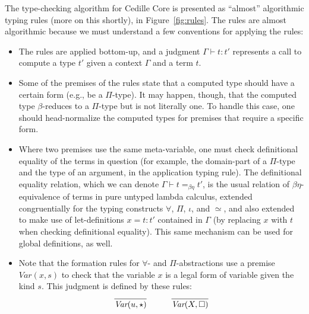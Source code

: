 \documentclass{article}
\begin{document}
The type-checking algorithm for Cedille Core is presented as ``almost'' algorithmic typing rules (more on this shortly),
in Figure~\ref{fig:rules}.  The rules are almost algorithmic because we must understand a few conventions for applying the rules:

\begin{itemize}
\item The rules are applied bottom-up, and a judgment $\Gamma\vdash t : t'$ represents a call to compute
  a type $t'$ given a context $\Gamma$ and a term $t$.
\item Some of the premises of the rules state that a computed type should have a certain form (e.g., be a $\Pi$-type).  It may happen, though, that the computed type $\beta$-reduces to a $\Pi$-type but is not literally one.  To handle this case, one should head-normalize the computed types for premises that require a specific form.
\item Where two premises use the same meta-variable, one must check definitional equality of the terms in question (for example, the domain-part of a $\Pi$-type and the type of an argument, in the application typing rule).
  The definitional equality relation, which we can denote $\Gamma \vdash t =_{\beta\eta} t'$,
  is the usual relation of $\beta\eta$-equivalence of
terms in pure untyped lambda calculus, extended congruentially for the
typing constructs $\forall$, $\Pi$, $\iota$, and $\simeq$, and also
extended to make use of let-definitions $x = t : t'$ contained in
$\Gamma$ (by replacing $x$ with $t$ when checking definitional
equality).  This same mechanism can be used for global definitions, as
well.
\item Note that the formation rules for $\forall$- and $\Pi$-abstractions use
  a premise $\textit{Var}(x,s)$ to check
  that the variable $x$ is a legal form of variable given the kind $s$.  This
  judgment is defined by these rules:
  \[
  \begin{array}{lll}
    \infer{\textit{Var}(u,\star)}{\ } & \ \ \ & \infer{\textit{Var}(X,\Box)}{\ }
  \end{array}
  \]
  
\end{itemize}
\end{document}
